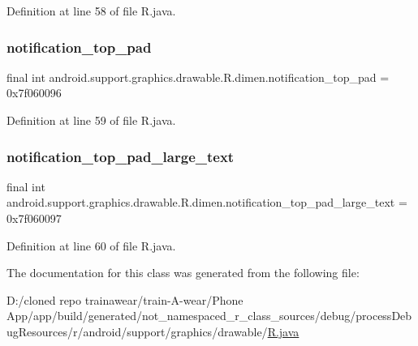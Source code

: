 Definition at line 58 of file R.\+java.

\mbox{\label{classandroid_1_1support_1_1graphics_1_1drawable_1_1_r_1_1dimen_a97a335d4f70bf2b2739f6c34c4e82100}} 
\subsubsection{\texorpdfstring{notification\_top\_pad}{notification\_top\_pad}}
{\footnotesize\ttfamily final int android.\+support.\+graphics.\+drawable.\+R.\+dimen.\+notification\+\_\+top\+\_\+pad = 0x7f060096\hspace{0.3cm}{\ttfamily [static]}}



Definition at line 59 of file R.\+java.

\mbox{\label{classandroid_1_1support_1_1graphics_1_1drawable_1_1_r_1_1dimen_a13b91dd416c56f3d0671a35a8cde2614}} 
\subsubsection{\texorpdfstring{notification\_top\_pad\_large\_text}{notification\_top\_pad\_large\_text}}
{\footnotesize\ttfamily final int android.\+support.\+graphics.\+drawable.\+R.\+dimen.\+notification\+\_\+top\+\_\+pad\+\_\+large\+\_\+text = 0x7f060097\hspace{0.3cm}{\ttfamily [static]}}



Definition at line 60 of file R.\+java.



The documentation for this class was generated from the following file\+:\begin{DoxyCompactItemize}
\item 
D\+:/cloned repo trainawear/train-\/\+A-\/wear/\+Phone App/app/build/generated/not\+\_\+namespaced\+\_\+r\+\_\+class\+\_\+sources/debug/process\+Debug\+Resources/r/android/support/graphics/drawable/\mbox{\hyperlink{process_debug_resources_2r_2android_2support_2graphics_2drawable_2_r_8java}{R.\+java}}\end{DoxyCompactItemize}
